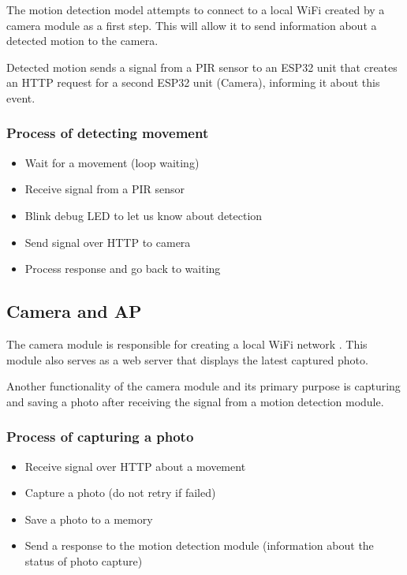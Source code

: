 \documentclass{article}
\begin{document}
    The motion detection model attempts to connect to
    a local WiFi created by a camera module as a first step. 
    This will allow it to send information about a detected motion 
    to the camera.
    
    Detected motion sends a signal from a PIR sensor to an ESP32 unit
    that creates an HTTP request for a second ESP32 unit (Camera), 
    informing it about this event.
    
    \subsubsection{Process of detecting movement}
    \begin{itemize}
        \item Wait for a movement (loop waiting)
        \item Receive signal from a PIR sensor
        \item Blink debug LED to let us know about detection
        \item Send signal over HTTP to camera
        \item Process response and go back to waiting
    \end{itemize}
    
    \subsection{Camera and AP}
    The camera module is responsible for creating a local WiFi network
    . This module also serves as a web server that
    displays the latest captured photo.
    
    Another functionality of the camera module and its primary purpose is
    capturing and saving a photo after receiving the signal 
    from a motion detection module.
    
    \subsubsection{Process of capturing a photo}
    \begin{itemize}
        \item Receive signal over HTTP about a movement
        \item Capture a photo (do not retry if failed)
        \item Save a photo to a memory
        \item Send a response to the motion detection module
            (information about the status of photo capture)
    \end{itemize}
    
\end{document}
